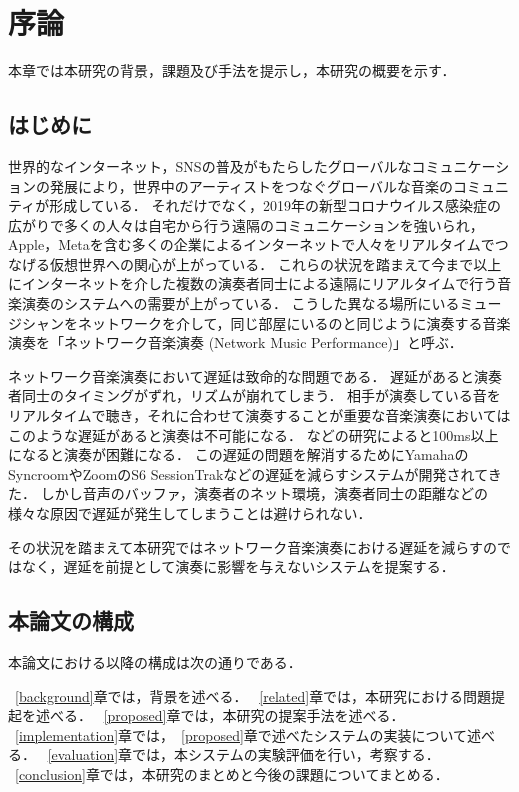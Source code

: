 \chapter{序論}
\label{introduction}

本章では本研究の背景，課題及び手法を提示し，本研究の概要を示す．

\section{はじめに}
\label{introduction:background}

世界的なインターネット，SNSの普及がもたらしたグローバルなコミュニケーションの発展により，世界中のアーティストをつなぐグローバルな音楽のコミュニティが形成している．
それだけでなく，2019年の新型コロナウイルス感染症の広がりで多くの人々は自宅から行う遠隔のコミュニケーションを強いられ，Apple，Metaを含む多くの企業によるインターネットで人々をリアルタイムでつなげる仮想世界への関心が上がっている．
これらの状況を踏まえて今まで以上にインターネットを介した複数の演奏者同士による遠隔にリアルタイムで行う音楽演奏のシステムへの需要が上がっている．
こうした異なる場所にいるミュージシャンをネットワークを介して，同じ部屋にいるのと同じように演奏する音楽演奏を「ネットワーク音楽演奏 (Network Music Performance)\cite{lazzaro}」と呼ぶ．

ネットワーク音楽演奏において遅延は致命的な問題である．
遅延があると演奏者同士のタイミングがずれ，リズムが崩れてしまう．
相手が演奏している音をリアルタイムで聴き，それに合わせて演奏することが重要な音楽演奏においてはこのような遅延があると演奏は不可能になる．
\cite{latency:effect}などの研究によると100ms以上になると演奏が困難になる．
この遅延の問題を解消するためにYamahaのSyncroom\cite{syncroom}やZoomのS6 SessionTrakなどの遅延を減らすシステムが開発されてきた．
しかし音声のバッファ，演奏者のネット環境，演奏者同士の距離などの様々な原因で遅延が発生してしまうことは避けられない．

その状況を踏まえて本研究ではネットワーク音楽演奏における遅延を減らすのではなく，遅延を前提として演奏に影響を与えないシステムを提案する．

\section{本論文の構成}

本論文における以降の構成は次の通りである．

~\ref{background}章では，背景を述べる．
~\ref{related}章では，本研究における問題提起を述べる．
~\ref{proposed}章では，本研究の提案手法を述べる．
~\ref{implementation}章では，~\ref{proposed}章で述べたシステムの実装について述べる．
~\ref{evaluation}章では，本システムの実験評価を行い，考察する．
~\ref{conclusion}章では，本研究のまとめと今後の課題についてまとめる．


